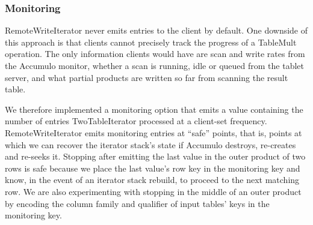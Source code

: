 \subsubsection{Monitoring}
RemoteWriteIterator never emits entries to the client by default. 
One downside of this approach is that clients cannot precisely track the progress of a TableMult operation.
The only information clients would have are scan and write rates from the Accumulo monitor,
whether a scan is running, idle or queued from the tablet server, and what partial products 
are written so far from scanning the result table.

We therefore implemented a monitoring option that emits a value
containing the number of entries TwoTableIterator processed
at a client-set frequency.
RemoteWriteIterator emits monitoring entries at ``safe'' points, that is,
points at which we can recover the iterator stack's state 
if Accumulo destroys, re-creates and re-seeks it.
Stopping after emitting the last value in the outer product of two rows is safe 
because we place the last value's row key in the monitoring key and know, 
in the event of an iterator stack rebuild, to proceed to the next matching row.
We are also experimenting with stopping in the middle of an outer product by encoding the 
column family and qualifier of input tables' keys in the monitoring key.




 



